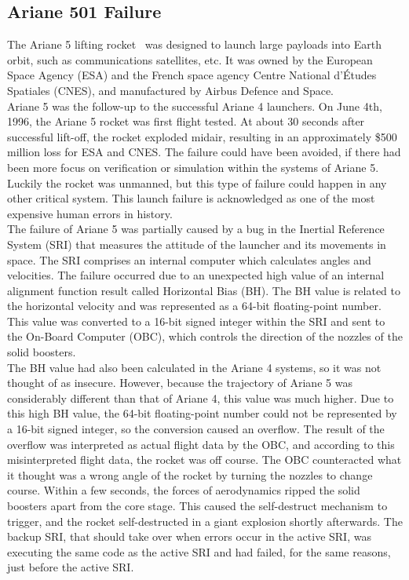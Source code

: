 \subsection{Ariane 501 Failure}
The Ariane 5 lifting rocket~\cite{InquiryBoard1996} was designed to launch large payloads into Earth orbit, such as communications satellites, etc. It was owned by the European Space Agency (ESA) and the French space agency Centre National d'\'Etudes Spatiales (CNES), and manufactured by Airbus Defence and Space.\\

Ariane 5 was the follow-up to the successful Ariane 4 launchers. On June 4th, 1996, the Ariane 5 rocket was first flight tested. At about 30 seconds after successful lift-off, the rocket exploded midair, resulting in an approximately \$500 million loss for ESA and CNES. The failure could have been avoided, if there had been more focus on verification or simulation within the systems of Ariane 5. Luckily the rocket was unmanned, but this type of failure could happen in any other critical system. This launch failure is acknowledged as one of the most expensive human errors in history. \\

The failure of Ariane 5 was partially caused by a bug in the Inertial Reference System (SRI) that measures the attitude of the launcher and its movements in space. The SRI comprises an internal computer which calculates angles and velocities.
The failure occurred due to an unexpected high value of an internal alignment function result called Horizontal Bias (BH). The BH value is related to the horizontal velocity and was represented as a 64-bit floating-point number. This value was converted to a 16-bit signed integer within the SRI and sent to the On-Board Computer (OBC), which controls the direction of the nozzles of the solid boosters.\\

The BH value had also been calculated in the Ariane 4 systems, so it was not thought of as insecure. However, because the trajectory of Ariane 5 was considerably different than that of Ariane 4, this value was much higher. Due to this high BH value, the 64-bit floating-point number could not be represented by a 16-bit signed integer, so the conversion caused an overflow.
The result of the overflow was interpreted as actual flight data by the OBC, and according to this misinterpreted flight data, the rocket was off course. The OBC counteracted what it thought was a wrong angle of the rocket by turning the nozzles to change course. Within a few seconds, the forces of aerodynamics ripped the solid boosters apart from the core stage. This caused the self-destruct mechanism to trigger, and the rocket self-destructed in a giant explosion shortly afterwards. The backup SRI, that should take over when errors occur in the active SRI, was executing the same code as the active SRI and had failed, for the same reasons, just before the active SRI.\\


